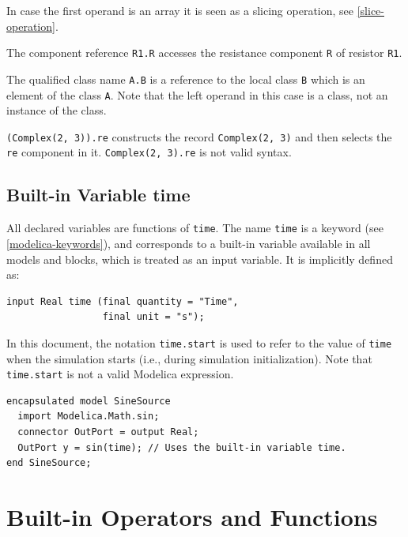 In case the first operand is an array it is seen as a slicing operation, see \cref{slice-operation}.

\begin{example}
The component reference \lstinline!R1.R! accesses the resistance component \lstinline!R! of resistor \lstinline!R1!.

The qualified class name \lstinline!A.B! is a reference to the local class \lstinline!B! which is an element of the class \lstinline!A!.
Note that the left operand in this case is a class, not an instance of the class.

\lstinline!(Complex(2, 3)).re! constructs the record \lstinline!Complex(2, 3)! and then selects the \lstinline!re! component in it.
\lstinline!Complex(2, 3).re! is not valid syntax.
\end{example}

\subsection{Built-in Variable time}\label{built-in-variable-time}

All declared variables are functions of \lstinline!time!.
The name \lstinline!time! is a keyword (see \cref{modelica-keywords}), and corresponds to a built-in variable available in all models and blocks, which is treated as an input variable.
It is implicitly defined as:
\begin{lstlisting}[language=modelica]
input Real time (final quantity = "Time",
                 final unit = "s");
\end{lstlisting}

In this document, the notation \lstinline!time.start! is used to refer to the value of \lstinline!time! when the simulation starts (i.e., during simulation initialization).
Note that \lstinline!time.start! is not a valid Modelica expression.

\begin{example}
\begin{lstlisting}[language=modelica]
encapsulated model SineSource
  import Modelica.Math.sin;
  connector OutPort = output Real;
  OutPort y = sin(time); // Uses the built-in variable time.
end SineSource;
\end{lstlisting}
\end{example}

\section{Built-in Operators and Functions}\label{built-in-intrinsic-operators-with-function-syntax}

